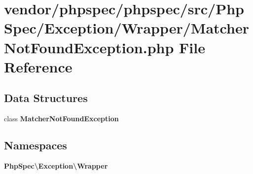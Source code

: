 \section{vendor/phpspec/phpspec/src/\+Php\+Spec/\+Exception/\+Wrapper/\+Matcher\+Not\+Found\+Exception.php File Reference}
\label{_matcher_not_found_exception_8php}
\subsection*{Data Structures}
\begin{DoxyCompactItemize}
\item 
class {\bf Matcher\+Not\+Found\+Exception}
\end{DoxyCompactItemize}
\subsection*{Namespaces}
\begin{DoxyCompactItemize}
\item 
 {\bf Php\+Spec\textbackslash{}\+Exception\textbackslash{}\+Wrapper}
\end{DoxyCompactItemize}
